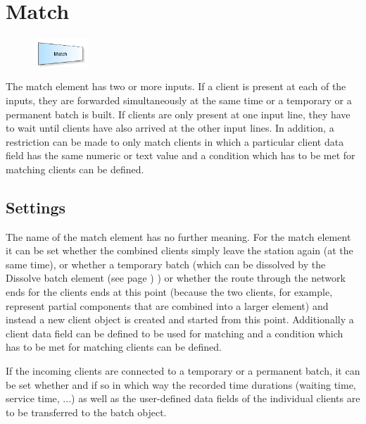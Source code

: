 \section{Match}
\label{ref:ModelElementMatch}

\begin{figure}
\vspace{-22pt}
\includegraphics[width=2cm]{imageModelElementMatch.png}
\vspace{-22pt}
\end{figure}

The match element has two or more inputs. If a client is present at each of the inputs, they are forwarded simultaneously
at the same time or a temporary or a permanent batch is built. If clients are only present at one input line, they have
to wait until clients have also arrived at the other input lines.
In addition, a restriction can be made to only match clients in which a particular client data field has the same
numeric or text value and a condition which has to be met for matching clients can be defined.

\subsection*{Settings}

The name of the match element has no further meaning. For the match element it can be set whether the combined
clients simply leave the station again (at the same time), or whether a temporary batch (which
can be dissolved by the Dissolve batch element (see page \pageref{ref:ModelElementSeparate}) ) or whether the route
through the network ends for the clients ends at this point (because the two clients, for example, represent
partial components that are combined into a larger element) and instead a new client object is created and
started from this point. Additionally a client data field can be defined to be used for matching and a
condition which has to be met for matching clients can be defined.

If the incoming clients are connected to a temporary or a permanent batch, it can be set whether and if so
in which way the recorded time durations (waiting time, service time, ...) as well as the user-defined
data fields of the individual clients are to be transferred to the batch object.


